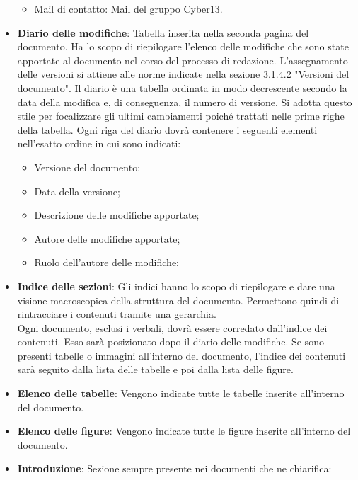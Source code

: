 \begin{itemize}
\begin{itemize}
                    \item Mail di contatto: Mail del gruppo Cyber13.
                \end{itemize}
            \item \textbf{Diario delle modifiche}: Tabella inserita nella seconda pagina del documento. Ha lo scopo di riepilogare l'elenco delle modifiche che sono state apportate al documento nel corso del processo di redazione. L'assegnamento delle versioni si attiene alle norme indicate nella sezione 3.1.4.2 "Versioni del documento".
            Il diario è una tabella ordinata in modo decrescente secondo la data della modifica e, di conseguenza, il numero di versione. Si adotta questo stile per focalizzare gli ultimi cambiamenti poiché trattati nelle prime righe della tabella.
            Ogni riga del diario dovrà contenere i seguenti elementi nell'esatto ordine in cui sono indicati:
                \begin{itemize}
                    \item Versione del documento;
                    \item Data della versione;
                    \item Descrizione delle modifiche apportate;
                    \item Autore delle modifiche apportate;
                    \item Ruolo dell'autore delle modifiche;
                \end{itemize}
            \item \textbf{Indice delle sezioni}: Gli indici hanno lo scopo di riepilogare e dare una visione macroscopica della struttura del documento. Permettono quindi di rintracciare i contenuti tramite una gerarchia. \\
            Ogni documento, esclusi i verbali, dovrà essere corredato dall'indice dei contenuti. 
            Esso sarà posizionato dopo il diario delle modifiche. Se sono presenti tabelle o immagini all'interno del documento, l’indice dei contenuti sarà seguito dalla lista delle tabelle e poi dalla lista delle figure.
            \item \textbf{Elenco delle tabelle}: Vengono indicate tutte le tabelle inserite all'interno del documento.
            \item \textbf{Elenco delle figure}: Vengono indicate tutte le figure inserite all'interno del documento.
            \item \textbf{Introduzione}: Sezione sempre presente nei documenti che ne chiarifica:

\end{itemize}
